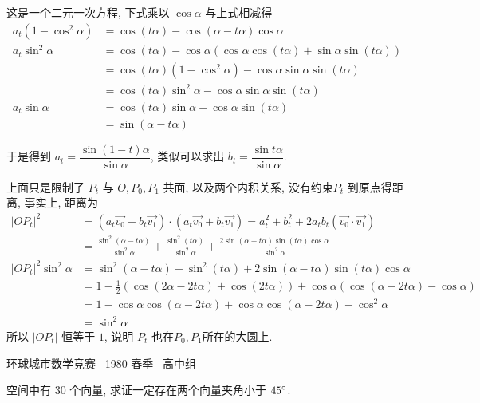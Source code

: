 这是一个二元一次方程, 下式乘以 $\cos\alpha$ 与上式相减得
\begin{align*}
a_t(1-\cos^2\alpha) &= \cos(t\alpha) - \cos(\alpha-t\alpha) \cos\alpha \\
a_t\sin^2\alpha &= \cos(t\alpha) - \cos\alpha(\cos\alpha\cos(t\alpha)+\sin\alpha\sin(t\alpha))\\
 &= \cos(t\alpha)(1-\cos^2\alpha) - \cos\alpha\sin\alpha\sin(t\alpha)\\
&= \cos(t\alpha)\sin^2\alpha - \cos\alpha\sin\alpha\sin(t\alpha)\\
a_t\sin\alpha &= \cos(t\alpha)\sin\alpha - \cos\alpha\sin(t\alpha)\\
&= \sin(\alpha-t\alpha)
\end{align*}

于是得到 $a_t = \dfrac{\sin(1-t)\alpha}{\sin\alpha}$, 类似可以求出 $b_t = \dfrac{\sin t\alpha}{\sin\alpha}$. 

上面只是限制了 $P_t$ 与 $O, P_0, P_1$ 共面, 以及两个内积关系, 没有约束$P_t$ 到原点得距离, 事实上, 距离为
\begin{align*}
|OP_t|^2 &= (a_t \vec{v_0} + b_t \vec{v_1})\cdot(a_t \vec{v_0} + b_t \vec{v_1}) = a_t^2 + b_t^2 + 2a_tb_t(\vec{v_0}\cdot\vec{v_1})\\ 
&= \frac{\sin^2(\alpha - t\alpha)}{\sin^2\alpha} + \frac{\sin^2(t\alpha)}{\sin^2\alpha} + \frac{2\sin(\alpha - t\alpha)\sin(t\alpha)\cos\alpha}{\sin^2\alpha}\\
|OP_t|^2 \sin^2\alpha &= \sin^2(\alpha - t\alpha) + \sin^2(t\alpha) + 2\sin(\alpha - t\alpha)\sin(t\alpha)\cos\alpha\\
&= 1-\frac{1}{2}(\cos(2\alpha - 2t\alpha) + \cos(2t\alpha)) + \cos\alpha(\cos(\alpha - 2t\alpha) - \cos\alpha)\\
&= 1 - \cos\alpha\cos(\alpha - 2t\alpha) + \cos\alpha\cos(\alpha-2t\alpha) - \cos^2\alpha\\
&= \sin^2\alpha
\end{align*}
所以 $|OP_t|$ 恒等于 $1$, 说明 $P_t$ 也在$P_0, P_1$所在的大圆上.

\newpage

\noindent 环球城市数学竞赛~ 1980 春季~ 高中组

空间中有 30 个向量, 求证一定存在两个向量夹角小于 $ 45 \degree $.

